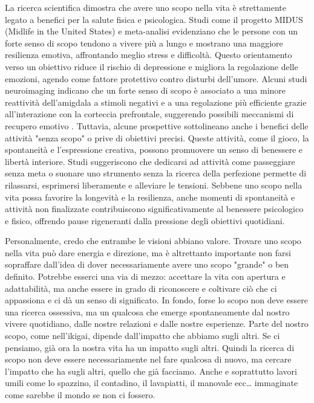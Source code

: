 \documentclass[12pt]{book} %
\begin{document}
\begin{mdframed}[linewidth=1pt]
La ricerca scientifica dimostra che avere uno scopo nella vita è strettamente legato a benefici per la salute fisica e psicologica. Studi come il progetto MIDUS (Midlife in the United States) e meta-analisi evidenziano che le persone con un forte senso di scopo tendono a vivere più a lungo e mostrano una maggiore resilienza emotiva, affrontando meglio stress e difficoltà. Questo orientamento verso un obiettivo riduce il rischio di depressione e migliora la regolazione delle emozioni, agendo come fattore protettivo contro disturbi dell’umore. Alcuni studi neuroimaging indicano che un forte senso di scopo è associato a una minore reattività dell’amigdala a stimoli negativi e a una regolazione più efficiente grazie all’interazione con la corteccia prefrontale, suggerendo possibili meccanismi di recupero emotivo  . Tuttavia, alcune prospettive sottolineano anche i benefici delle attività "senza scopo" o prive di obiettivi precisi. Queste attività, come il gioco, la spontaneità e l’espressione creativa, possono promuovere un senso di benessere e libertà interiore. Studi suggeriscono che dedicarsi ad attività come passeggiare senza meta o suonare uno strumento senza la ricerca della perfezione permette di rilassarsi, esprimersi liberamente e alleviare le tensioni. Sebbene uno scopo nella vita possa favorire la longevità e la resilienza, anche momenti di spontaneità e attività non finalizzate contribuiscono significativamente al benessere psicologico e fisico, offrendo pause rigeneranti dalla pressione degli obiettivi quotidiani.

Personalmente, credo che entrambe le visioni abbiano valore. Trovare uno scopo nella vita può dare energia e direzione, ma è altrettanto importante non farsi sopraffare dall'idea di dover necessariamente avere uno scopo "grande" o ben definito. Potrebbe esserci una via di mezzo: accettare la vita con apertura e adattabilità, ma anche essere in grado di riconoscere e coltivare ciò che ci appassiona e ci dà un senso di significato. In fondo, forse lo scopo non deve essere una ricerca ossessiva, ma un qualcosa che emerge spontaneamente dal nostro vivere quotidiano, dalle nostre relazioni e dalle nostre esperienze. Parte del nostro scopo, come nell'ikigai, dipende dall'impatto che abbiamo sugli altri. Se ci pensiamo, già ora la nostra vita ha un impatto sugli altri. Quindi la ricerca di scopo non deve essere necessariamente nel fare qualcosa di nuovo, ma cercare l'impatto che ha sugli altri, quello che già facciamo. Anche e soprattutto lavori umili come lo spazzino, il contadino, il lavapiatti, il manovale ecc… immaginate come sarebbe il mondo se non ci fossero.
\end{mdframed}
\end{document}
